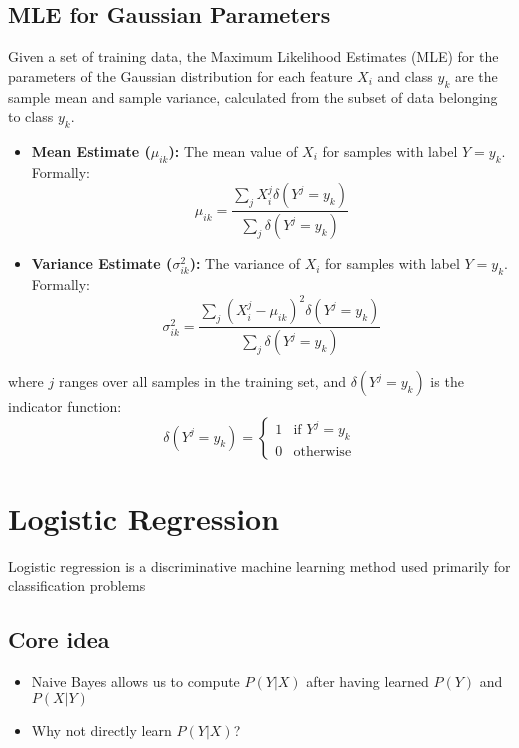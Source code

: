 \subsection{MLE for Gaussian Parameters}
Given a set of training data, the Maximum Likelihood Estimates (MLE) for the parameters of the Gaussian distribution for each feature $X_i$ and class $y_k$ are the sample mean and sample variance, calculated from the subset of data belonging to class $y_k$.
    
    \begin{itemize}
        \item \textbf{Mean Estimate ($\mu_{ik}$):} The mean value of $X_i$ for samples with label $Y=y_k$. Formally:
        \[
            \mu_{ik} = \frac{\sum_j X_i^j \delta(Y^j = y_k)}{\sum_j \delta(Y^j = y_k)}
        \]
        \item \textbf{Variance Estimate ($\sigma_{ik}^2$):} The variance of $X_i$ for samples with label $Y=y_k$. Formally:
        \[
            \sigma^2_{ik} = \frac{\sum_j (X_i^j - \mu_{ik})^2 \delta(Y^j = y_k)}{\sum_j \delta(Y^j = y_k)}
        \]
    \end{itemize}
    where $j$ ranges over all samples in the training set, and $\delta(Y^j = y_k)$ is the indicator function:
    \[
        \delta(Y^j = y_k) = \begin{cases} 
            1 & \text{if } Y^j = y_k \\ 
            0 & \text{otherwise} 
        \end{cases}
    \]

\section{Logistic Regression}
Logistic regression is a discriminative machine learning method used primarily for classification problems

\subsection{Core idea}
\begin{itemize}
    \item Naive Bayes allows us to compute $P(Y |X )$ after having learned $P(Y)$ and $P(X |Y)$
    \item Why not directly learn $P(Y |X )$?
\end{itemize}

